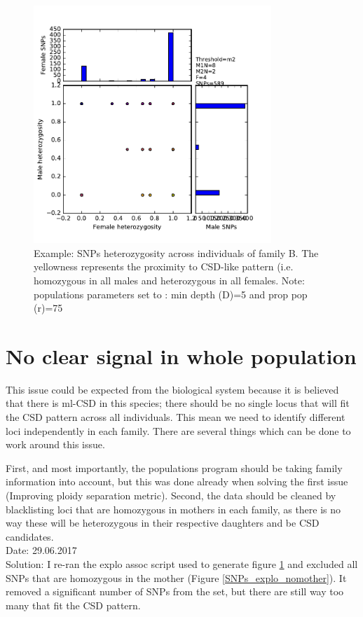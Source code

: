 \documentclass[10pt,a4paper]{report}
\begin{document}
\begin{figure}[h]
	\begin{center}
		\includegraphics[width=0.8\textwidth]{cleaning_genomic_data/assoc_explo_fam/B.pdf}
		\caption{Example: SNPs heterozygosity across individuals of family B. The yellowness represents the proximity to CSD-like pattern (i.e. homozygous in all males and heterozygous in all females. Note: populations parameters set to : min depth (D)=5 and prop pop (r)=75}
		\label{SNPs_explo_fam}
	\end{center}
\end{figure}


\section{No clear signal in whole population}

This issue could be expected from the biological system because it is believed that there is ml-CSD in this species; there should be no single locus that will fit the CSD pattern across all individuals. This mean we need to identify different loci independently in each family. There are several things which can be done to work around this issue. 

First, and most importantly, the populations program should be taking family information into account, but this was done already when solving the first issue (Improving ploidy separation metric). Second, the data should be cleaned by blacklisting loci that are homozygous in mothers in each family, as there is no way these will be heterozygous in their respective daughters and be CSD candidates.
\\
Date: 29.06.2017
\\
Solution: I re-ran the explo assoc script used to generate figure \ref{SNPs_explo_fam} and excluded all SNPs that are homozygous in the mother (Figure \ref{SNPs_explo_nomother}). It removed a significant number of SNPs from the set, but there are still way too many that fit the CSD pattern.
\end{document}
